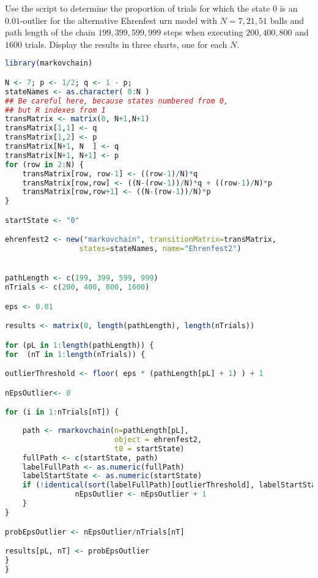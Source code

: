 \documentclass[12pt]{article}
\begin{document}
\begin{exercise}
    Use the script to determine the proportion of trials for which the
    state \( 0 \) is an \( 0.01 \)-outlier for the alternative Ehrenfest
    urn model with \( N = 7, 21, 51 \) balls and path length of the
    chain \( 199, 399, 599, 999 \) steps when executing \( 200, 400, 800
    \) and \( 1600 \) trials.  Display the results in three charts, one
    for each \( N \).
\end{exercise}
\begin{solution}

\begin{lstlisting}[language=R]
library(markovchain)

N <- 7; p <- 1/2; q <- 1 - p;
stateNames <- as.character( 0:N )
## Be careful here, because states numbered from 0,
## but R indexes from 1
transMatrix <- matrix(0, N+1,N+1)
transMatrix[1,1] <- q
transMatrix[1,2] <- p
transMatrix[N+1, N  ] <- q
transMatrix[N+1, N+1] <- p
for (row in 2:N) {
    transMatrix[row, row-1] <- ((row-1)/N)*q
    transMatrix[row,row] <- ((N-(row-1))/N)*q + ((row-1)/N)*p
    transMatrix[row,row+1] <- ((N-(row-1))/N)*p
}

startState <- "0"

ehrenfest2 <- new("markovchain", transitionMatrix=transMatrix,
                 states=stateNames, name="Ehrenfest2")


pathLength <- c(199, 399, 599, 999)
nTrials <- c(200, 400, 800, 1600)

eps <- 0.01

results <- matrix(0, length(pathLength), length(nTrials))

for (pL in 1:length(pathLength)) {
for  (nT in 1:length(nTrials)) {

outlierThreshold <- floor( eps * (pathLength[pL] + 1) ) + 1

nEpsOutlier<- 0

for (i in 1:nTrials[nT]) {
            
    path <- rmarkovchain(n=pathLength[pL],
                         object = ehrenfest2,
                         t0 = startState)
    fullPath <- c(startState, path)
    labelFullPath <- as.numeric(fullPath)
    labelStartState <- as.numeric(startState)
    if (!identical(sort(labelFullPath)[outlierThreshold], labelStartState)) {
                nEpsOutlier <- nEpsOutlier + 1
    }
}

probEpsOutlier <- nEpsOutlier/nTrials[nT]

results[pL, nT] <- probEpsOutlier
}
}


\end{lstlisting}
\end{solution}
\end{document}
